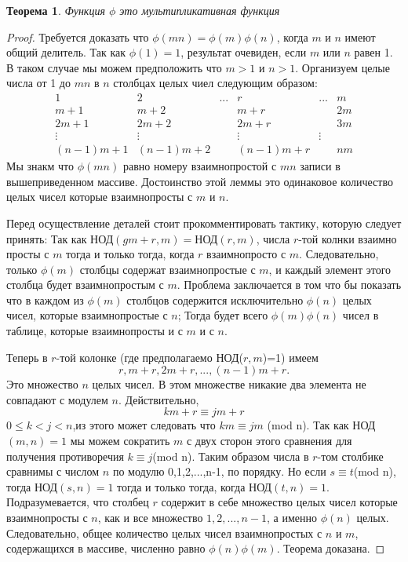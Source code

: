 \documentclass[11pt]{article}
\newtheorem{theorem}{Теорема}
\begin{document}
\begin{theorem}
	Функция $\phi$ это мультипликативная функция
\end{theorem}
\begin{proof}
	Требуется доказать что $\phi (mn)=\phi (m) \phi(n)$, когда $m$ и $n$ имеют общий делитель. Так как $\phi(1)=1$, результат очевиден, если $m$ или $n$ равен 1. В таком случае мы можем предположить что $m>1$ и $n>1$. Организуем целые числа от 1 до $mn$ в $n$ столбцах целых чиел следующим образом:
	\[
	\begin{matrix}
	1 & 2 & ... & r & ... & m \\
	m+1 & m+2 &  & m+r& & 2m\\
	2m+1 & 2m+2 &  & 2m+r& & 3m\\
	\vdots&\vdots& &\vdots&\vdots\\
	(n-1)m+1 & (n-1)m+2 &  & (n-1)m+r& & nm
	\end{matrix}
	\]
	Мы знакм что $\phi(mn)$ равно номеру взаимнопростой с $mn$ записи в вышеприведенном массиве. Достоинство этой леммы это одинаковое количество целых чисел которые взаимнопросты с $m$ и $n$.
	
	Перед осуществление деталей стоит прокомментировать тактику, которую следует принять: Так как НОД$(gm+r,m)=$НОД$(r,m)$, числа $r$-той колнки взаимно просты с $m$ тогда и только тогда, когда $r$ взаимнопросто с $m$. Следовательно, только $\phi(m)$ столбцы содержат взаимнопростые с $m$, и каждый элемент этого столбца будет взаимнопростым с $m$. Проблема заключается в том что бы показать что в каждом из $\phi(m)$ столбцов содержится исключительно $\phi(n)$ целых чисел, которые взаимнопростые с $n$; Тогда будет всего $\phi(m) \phi(n)$ чисел в таблице, которые взаимнопросты и с $m$  и с $n$.
	
	Теперь в $r$-той колонке (где предполагаемо НОД($r,m$)=1) имеем
	\[
	r, m+r,2m+r,...,(n-1)m+r.
	\]
	Это множество $n$ целых чисел. В этом множестве никакие два элемента не совпадают с модулем $n$. Действительно,
	\[km+r \equiv jm+r
	\]
	$0\leq k<j<n$,из этого может следовать что $km\equiv jm$ (mod n). Так как НОД$(m,n)=1$ мы можем сократить $m$ с двух сторон этого сравнения для получения противоречия $k \equiv j$(mod n). Таким образом числа в $r$-том столбике сравнимы с числом $n$ по модулю 0,1,2,...,n-1, по порядку. Но если $s \equiv t $(mod n), тогда НОД$(s,n)=1$ тогда и только тогда, когда НОД$(t,n)=1$. Подразумевается, что столбец $r$ содержит в себе множество целых чисел которые взаимнопросты с $n$, как и все множество ${1,2,...,n-1}$, а именно $\phi(n)$ целых. Следовательно, общее количество целых чисел взаимнопростых с $n$ и $m$, содержащихся в массиве, численно равно $\phi(n) \phi(m)$. Теорема доказана.
\end{proof}
\end{document}
